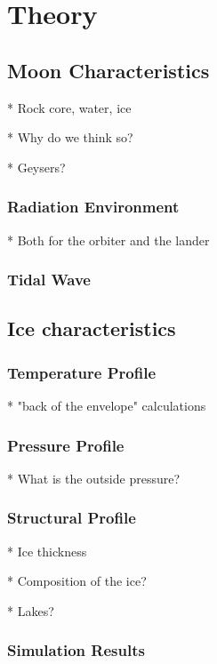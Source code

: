 \chapter{Theory}


\section{Moon Characteristics} %

* Rock core, water, ice

    * Why do we think so?
    
    * Geysers?
    
\subsection{Radiation Environment} %

* Both for the orbiter and the lander

\subsection{Tidal Wave} %

\section{Ice characteristics} %

\subsection{Temperature Profile}

* "back of the envelope" calculations

\subsection{Pressure Profile}

* What is the outside pressure?

\subsection{Structural Profile}

* Ice thickness

* Composition of the ice? %

* Lakes?

\subsection{Simulation Results}

